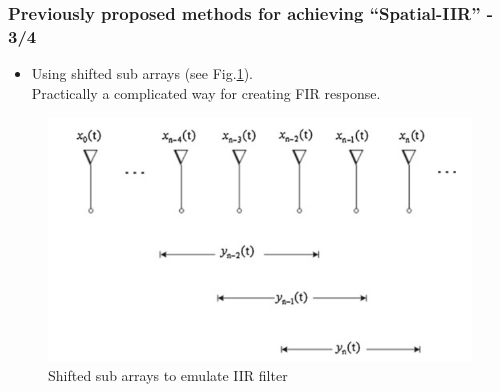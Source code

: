 \documentclass[10pt,pdflatex,headrule,landscape]{beamer}
\begin{document}
\begin{frame}
\frametitle{Previously proposed methods for achieving ``Spatial-IIR'' - 3/4}
\begin{minipage}{0.55\textwidth}
\begin{itemize}
\item
{
Using shifted sub arrays (see Fig.\ref{fig:ShiftedSubArraysWen}).
\\
Practically a complicated way for creating FIR response.
}
\end{itemize}
\end{minipage}
\begin{minipage}{0.44\textwidth}
\begin{figure}
\includegraphics[width=\textwidth]{Media/SpatialIIR_SubArrays.PNG}
\caption{Shifted sub arrays to emulate IIR filter}
\label{fig:ShiftedSubArraysWen}
\end{figure}
\end{minipage}
\end{frame}
\end{document}
